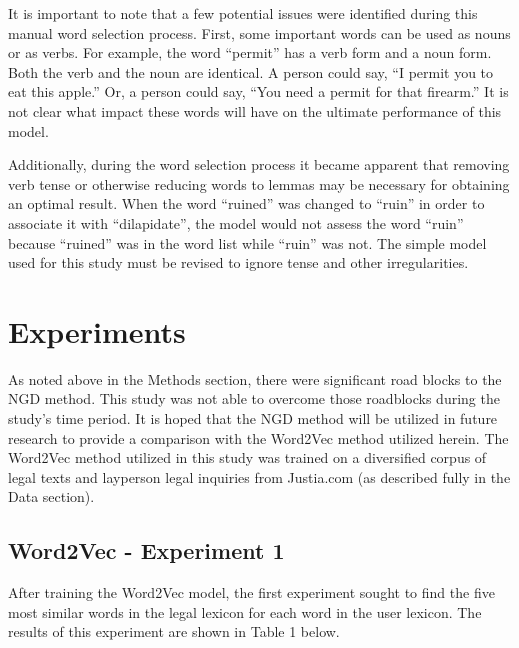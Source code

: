 \documentclass[11pt]{article}
\begin{document}
It is important to note that a few potential issues were identified during this manual word selection process.  First, some important words can be used as nouns or as verbs.  For example, the word ``permit'' has a verb form and a noun form.  Both the verb and the noun are identical.  A person could say, ``I permit you to eat this apple.''  Or, a person could say, ``You need a permit for that firearm.''  It is not clear what impact these words will have on the ultimate performance of this model.

Additionally, during the word selection process it became apparent that removing verb tense or otherwise reducing words to lemmas may be necessary for obtaining an optimal result.  When the word ``ruined'' was changed to ``ruin'' in order to associate it with ``dilapidate'', the model would not assess the word ``ruin'' because ``ruined'' was in the word list while ``ruin'' was not.  The simple model used for this study must be revised to ignore tense and other irregularities.

\section{Experiments}
As noted above in the Methods section, there were significant road blocks to the NGD method.  This study was not able to overcome those roadblocks during the study's time period.  It is hoped that the NGD method will be utilized in future research to provide a comparison with the Word2Vec method utilized herein.  The Word2Vec method utilized in this study was trained on a diversified corpus of legal texts and layperson legal inquiries from Justia.com (as described fully in the Data section).
\subsection{Word2Vec - Experiment 1}
After training the Word2Vec model, the first experiment sought to find the five most similar words in the legal lexicon for each word in the user lexicon.  The results of this experiment are shown in Table 1 below.  
\end{document}
